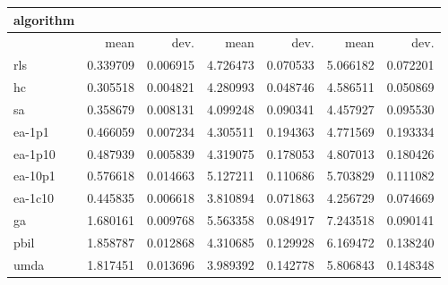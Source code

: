 \begin{tabular}{@{}l*{6}{>{{}}N{1}{2}}@{}}
\toprule
{algorithm} &  &  &  \\
\midrule
& {mean} & {dev.} & {mean} & {dev.} & {mean} & {dev.} \\
\midrule
rls & 0.339709 & 0.006915 & 4.726473 & 0.070533 & 5.066182 & 0.072201 \\
 hc & 0.305518 & 0.004821 & 4.280993 & 0.048746 & 4.586511 & 0.050869 \\
 sa & 0.358679 & 0.008131 & 4.099248 & 0.090341 & 4.457927 & 0.095530 \\
 ea-1p1 & 0.466059 & 0.007234 & 4.305511 & 0.194363 & 4.771569 & 0.193334 \\
 ea-1p10 & 0.487939 & 0.005839 & 4.319075 & 0.178053 & 4.807013 & 0.180426 \\
 ea-10p1 & 0.576618 & 0.014663 & 5.127211 & 0.110686 & 5.703829 & 0.111082 \\
 ea-1c10 & 0.445835 & 0.006618 & 3.810894 & 0.071863 & 4.256729 & 0.074669 \\
 ga & 1.680161 & 0.009768 & 5.563358 & 0.084917 & 7.243518 & 0.090141 \\
 pbil & 1.858787 & 0.012868 & 4.310685 & 0.129928 & 6.169472 & 0.138240 \\
 umda & 1.817451 & 0.013696 & 3.989392 & 0.142778 & 5.806843 & 0.148348 \\
 \bottomrule
\end{tabular}
